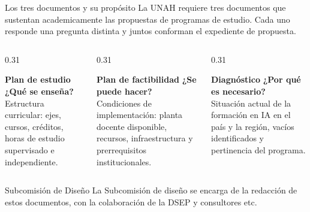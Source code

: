 \documentclass[10pt,aspectratio=169]{beamer}
\newcommand{\doc}[1]{\textbf{\textcolor{accentblue}{#1}}}
\begin{document}
\begin{frame}{Los tres documentos y su propósito}
  \small
  La UNAH requiere tres documentos que
  sustentan academicamente las propuestas de programas de estudio. Cada uno responde una pregunta distinta
  y juntos conforman el expediente de propuesta.

  \medskip
  \begin{columns}[t]
    \begin{column}{0.31\textwidth}
      \begin{block}{\footnotesize\doc{Plan de estudio}}
        \footnotesize
        \textbf{¿Qué se enseña?}\\
        Estructura curricular: ejes, cursos, créditos, horas de
        estudio supervisado e independiente.
      \end{block}
    \end{column}
    \begin{column}{0.31\textwidth}
      \begin{block}{\footnotesize\doc{Plan de factibilidad}}
        \footnotesize
        \textbf{¿Se puede hacer?}\\
        Condiciones de implementación: planta docente disponible,
        recursos, infraestructura y prerrequisitos institucionales.
      \end{block}
    \end{column}
    \begin{column}{0.31\textwidth}
      \begin{block}{\footnotesize\doc{Diagnóstico}}
        \footnotesize
        \textbf{¿Por qué es necesario?}\\
        Situación actual de la formación en IA en el país y la región,
        vacíos identificados y pertinencia del programa.
      \end{block}
    \end{column}
  \end{columns}

  \medskip
  \begin{alertblock}{Subcomisión de Diseño}
    \footnotesize
    La Subcomisión de diseño se encarga de la redacción de estos documentos, con la colaboración de la DSEP y consultores etc.
  \end{alertblock}
\end{frame}
\end{document}
